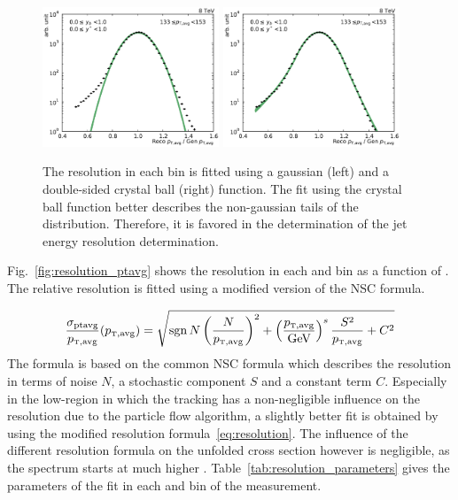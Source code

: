 \begin{figure}[h!tbp]
    \centering
    \includegraphics[width=0.47\textwidth]{figures/measurement/resolution_yb0ys0_bin10.pdf}\hfill
    \includegraphics[width=0.47\textwidth]{figures/measurement/resolution_yb0ys0_bin10_cb.pdf}
    \caption[Gaussian and crystal ball fit of resolution.]{The resolution in
        each \ptavg bin is fitted using a gaussian (left) and a double-sided crystal ball
        (right) function. The fit using the crystal ball function better describes the
        non-gaussian tails of the distribution. Therefore, it is favored in the
    determination of the jet energy resolution determination.}
    \label{fig:resolution_bin}
\end{figure}

Fig.~\ref{fig:resolution_ptavg} shows the resolution in each \ystar and
\yboost bin as a function of \ptavg. The relative resolution is fitted using a
modified version of the NSC formula.


\begin{equation}
    \frac{\sigma_{\text{ptavg}}}{\ptavg} (\ptavg) = \sqrt{\sgn{N} \left(\frac{N}{\ptavg}\right)^2 + \left(\frac{\ptavg}{\text{GeV}}\right)^s \frac{S^2}{\ptavg} + C^2 }
    \label{eq:resolution}
\end{equation}
%
The formula is based on the common NSC formula which describes the resolution in
terms of noise $N$, a stochastic component $S$ and a constant term $C$.
Especially in the low-\pt region in which the tracking has a non-negligible
influence on the resolution due to the particle flow algorithm, a slightly
better fit is obtained by using the modified resolution
formula~\ref{eq:resolution}. The influence of the different resolution formula
on the unfolded cross section however is negligible, as the spectrum starts at
much higher \pt. Table~\ref{tab:resolution_parameters} gives the parameters of
the fit in each \ystar and \yboost bin of the measurement.


